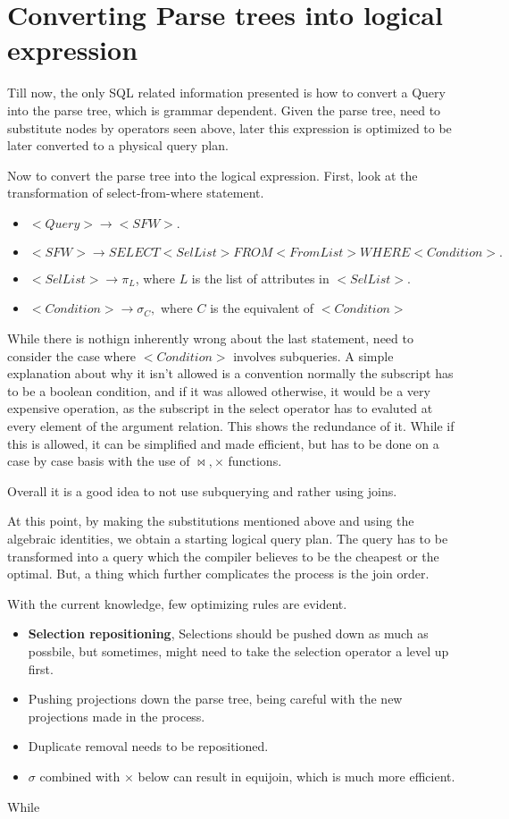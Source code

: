 \section{Converting Parse trees into logical expression}
Till now, the only SQL related information presented is how to convert a Query into the parse tree, which is grammar dependent. Given the parse tree, need to substitute nodes by operators seen above, later this expression is optimized to be later converted to a physical query plan.
\par Now to convert the parse tree into the logical expression. First, look at the transformation of select-from-where statement.
\begin{itemize}
\item $<Query> \rightarrow <SFW>.$
\item $<SFW> \rightarrow SELECT <SelList> FROM <FromList> WHERE <Condition>.$
\item $<SelList> \rightarrow \pi_{L}$, where $L$ is the list of attributes in $<SelList>.$
\item $<Condition> \rightarrow \sigma_{C},$ where $C$ is the equivalent of $<Condition>$ 
\end{itemize}
While there is nothign inherently wrong about the last statement, need to consider the case where $<Condition>$ involves subqueries. A simple explanation about why it isn't allowed is a convention normally the subscript has to be a boolean condition, and if it was allowed otherwise, it would be a very expensive operation, as the subscript in the select operator has to evaluted at every element of the argument relation. This shows the redundance of it. While if this is allowed, it can be simplified and made efficient, but has to be done on a case by case basis with the use of $\bowtie, \times$ functions.
\par Overall it is a good idea to not use subquerying and rather using joins.
\par At this point, by making the substitutions mentioned above and using the algebraic identities, we obtain a starting logical query plan. The query has to be transformed into a query which the compiler believes to be the cheapest or the optimal. But, a thing which further complicates the process is the join order.
\par With the current knowledge, few optimizing rules are evident.
\begin{itemize}
    \item \textbf{Selection repositioning}, Selections should be pushed down as much as possbile, but sometimes, might need to take the selection operator a level up first.
    \item Pushing projections down the parse tree, being careful with the new projections made in the process.
    \item Duplicate removal needs to be repositioned.
    \item $\sigma$ combined with $\times$ below can result in equijoin, which is much more efficient. 
\end{itemize}
\par While 
